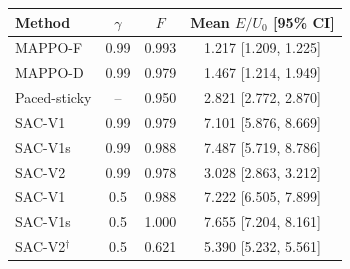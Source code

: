 \begin{tabular}{lccc}
\toprule
Method & $\gamma$ & $F$ & Mean $E/U_0$ [95\% CI] \\
\midrule
MAPPO-F & 0.99 & 0.993 & 1.217 [1.209, 1.225] \\
MAPPO-D & 0.99 & 0.979 & 1.467 [1.214, 1.949] \\
Paced-sticky & -- & 0.950 & 2.821 [2.772, 2.870] \\
\midrule
SAC-V1 & 0.99 & 0.979 & 7.101 [5.876, 8.669] \\
SAC-V1s & 0.99 & 0.988 & 7.487 [5.719, 8.786] \\
SAC-V2 & 0.99 & 0.978 & 3.028 [2.863, 3.212] \\
\midrule
SAC-V1 & 0.5 & 0.988 & 7.222 [6.505, 7.899] \\
SAC-V1s & 0.5 & 1.000 & 7.655 [7.204, 8.161] \\
SAC-V2$^\dagger$ & 0.5 & 0.621 & 5.390 [5.232, 5.561] \\
\bottomrule
\end{tabular}
